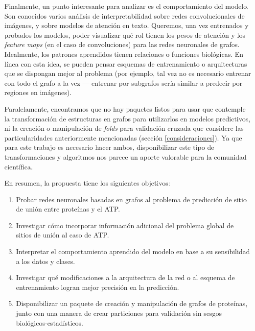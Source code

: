 \documentclass[
    left=2.0cm,         %
    right=2.0cm,        %
    top=2.0cm,          %
    bottom=2.5cm,         %
    bindingoffset=6mm,  %
    nohyphenation=false %
]{eiti/eiti-thesis}
\begin{document}
Finalmente, un punto interesante para analizar es el comportamiento del modelo. Son conocidos
varios análisis de interpretabilidad sobre redes convolucionales de 
imágenes\cite{olah2018interpretability}, y sobre
modelos de atención en texto\cite{attentionalyouneed}. Queremos, una vez entrenados
y probados los modelos,
poder visualizar qué rol tienen los pesos de atención y los \textit{feature maps} (en el caso
de convoluciones) para las redes neuronales de grafos. Idealmente, los patrones aprendidos
tienen relaciones o funciones biológicas. En línea con esta idea,
se pueden pensar esquemas de entrenamiento o arquitecturas que
se dispongan mejor al problema (por ejemplo, tal vez no es necesario entrenar con todo el grafo a la vez --- entrenar por subgrafos sería similar a predecir por regiones en imágenes).

Paralelamente, encontramos que no hay paquetes listos para usar que contemple la
transformación de estructuras en grafos para utilizarlos en modelos predictivos, ni
la creación o manipulación de \textit{folds} para validación cruzada que considere 
las particularidades anteriormente mencionadas (sección \ref{consideraciones}). Ya que
para este trabajo es necesario hacer ambos, disponibilizar este tipo de transformaciones
y algoritmos nos parece un aporte valorable para la comunidad científica.

En resumen, la propuesta tiene los siguientes objetivos:

\begin{enumerate}
    \item Probar redes neuronales basadas en grafos al problema de predicción 
    de sitio de unión entre proteínas y el ATP.
    \item Investigar cómo incorporar información adicional del
    problema global de sitios de unión al caso de ATP.
    \item Interpretar el comportamiento aprendido del modelo en base a su sensibilidad
    a los datos y clases.
    \item Investigar qué modificaciones a la arquitectura de la red o al
    esquema de entrenamiento logran mejor precisión en la predicción.
    \item Disponibilizar un paquete de creación y manipulación de grafos de proteínas,
    junto con una manera de crear particiones para validación sin sesgos
    biológicos-estadísticos.
\end{enumerate}

\end{document}
